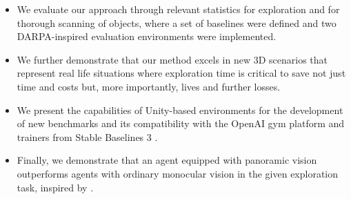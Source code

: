 \begin{itemize}
    \item We evaluate our approach through relevant statistics for exploration and for thorough scanning of objects, where a set of baselines were defined and two DARPA-inspired evaluation environments \cite{darpa_subterranean_challenge} were implemented.
    
    \item We further demonstrate that our method excels in new 3D scenarios that represent real life situations where exploration time is critical to save not just time and costs but, more importantly, lives and further losses. 
    
    \item We present the capabilities of Unity-based environments for the development of new benchmarks and its compatibility with the OpenAI gym platform \cite{openaigym} and trainers from Stable Baselines 3 \cite{github-dlr-rm-baselines3}. 

    \item Finally, we demonstrate that an agent equipped with panoramic vision outperforms agents with ordinary monocular vision in the given exploration task, inspired by \textcite{rill2021collision, wojek2012monocular}.

\end{itemize}

